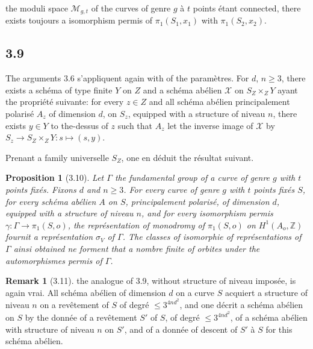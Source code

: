 \documentclass[12pt,a4paper]{article}
\theoremstyle{plain}
\newtheorem{proposition}{Proposition}[section]
\theoremstyle{definition}
\newtheorem{remark}{Remark}[section]
\newcommand{\ZZ}{\mathbb{Z}}
\begin{document}
{the moduli space $\mathcal{M}_{g,t}$ of the curves of genre $g$ \`{a} $t$ points \'{e}tant connected, there exists toujours a isomorphism permis of $\pi_{1}(S_{1}, x_{1})$ with $\pi_{1}(S_{2}, x_{2})$.

\subsection*{3.9}
The arguments 3.6 s'appliquent again with of the param\`{e}tres. For $d$, $n \geq 3$, there exists a sch\'{e}ma of type finite $Y$ on $Z$ and a sch\'{e}ma ab\'{e}lien $\mathcal{X}$ on $S_{Z} \times_{Z} Y$ ayant the propri\'{e}t\'{e} suivante: for every $z \in Z$ and all sch\'{e}ma ab\'{e}lien principalement polaris\'{e} $A_{z}$ of dimension $d$, on $S_{z}$, equipped with a structure of niveau $n$, there exists $y \in Y$ to the-dessus of $z$ such that $A_{z}$ let the inverse image of $\mathcal{X}$ by $S_{z} \to S_{Z} \times_{Z} Y : s \mapsto (s, y)$.

Prenant a family universelle $S_{Z}$, one en d\'{e}duit the r\'{e}sultat suivant.

\begin{proposition}[3.10]
Let $\Gamma$ the fundamental group of a curve of genre $g$ with $t$ points fix\'{e}s. Fixons $d$ and $n \geq 3$. For every curve of genre $g$ with $t$ points fix\'{e}s $S$, for every sch\'{e}ma ab\'{e}lien $A$ on $S$, principalement polaris\'{e}, of dimension $d$, equipped with a structure of niveau $n$, and for every isomorphism permis $\gamma : \Gamma \to \pi_{1}(S,o)$, the repr\'{e}sentation of monodromy of $\pi_{1}(S,o)$ on $H^{1}(A_{o}, \ZZ)$ fournit a repr\'{e}sentation $\sigma_{V}$ of $\Gamma$. The classes of isomorphie of repr\'{e}sentations of $\Gamma$ ainsi obtained ne forment that a nombre finite of orbites under the automorphismes permis of $\Gamma$.
\end{proposition}

\begin{remark}[3.11]
the analogue of 3.9, without structure of niveau impos\'{e}e, is again vrai. All sch\'{e}ma ab\'{e}lien of dimension $d$ on a curve $S$ acquiert a structure of niveau $n$ on a rev\^{e}tement of $S$ of degr\'{e} $\leq 3^{4nd^{2}}$, and one d\'{e}crit a sch\'{e}ma ab\'{e}lien on $S$ by the donn\'{e}e of a rev\^{e}tement $S'$ of $S$, of degr\'{e} $\leq 3^{4nd^{2}}$, of a sch\'{e}ma ab\'{e}lien with structure of niveau $n$ on $S'$, and of a donn\'{e}e of descent of $S'$ \`{a} $S$ for this sch\'{e}ma ab\'{e}lien.
\end{remark}

}
\end{document}
